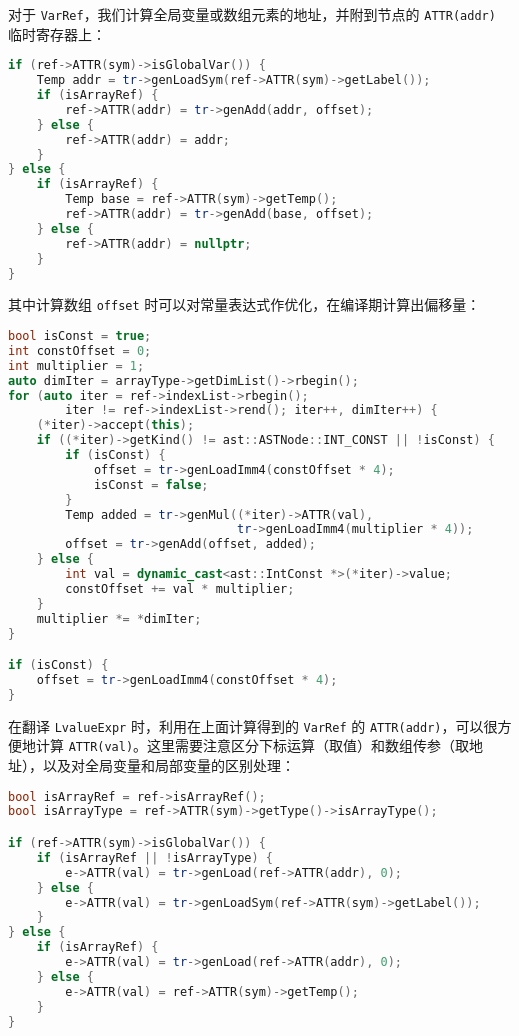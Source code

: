 \documentclass[a4paper]{article}
\begin{document}
对于 \texttt{VarRef}，我们计算全局变量或数组元素的地址，并附到节点的 \texttt{ATTR(addr)} 临时寄存器上：

\begin{lstlisting}[language=c++]
if (ref->ATTR(sym)->isGlobalVar()) {
    Temp addr = tr->genLoadSym(ref->ATTR(sym)->getLabel());
    if (isArrayRef) {
        ref->ATTR(addr) = tr->genAdd(addr, offset);
    } else {
        ref->ATTR(addr) = addr;
    }
} else {
    if (isArrayRef) {
        Temp base = ref->ATTR(sym)->getTemp();
        ref->ATTR(addr) = tr->genAdd(base, offset);
    } else {
        ref->ATTR(addr) = nullptr;
    }
}
\end{lstlisting}

其中计算数组 \texttt{offset} 时可以对常量表达式作优化，在编译期计算出偏移量：

\begin{lstlisting}[language=c++]
bool isConst = true;
int constOffset = 0;
int multiplier = 1;
auto dimIter = arrayType->getDimList()->rbegin();
for (auto iter = ref->indexList->rbegin();
        iter != ref->indexList->rend(); iter++, dimIter++) {
    (*iter)->accept(this);
    if ((*iter)->getKind() != ast::ASTNode::INT_CONST || !isConst) {
        if (isConst) {
            offset = tr->genLoadImm4(constOffset * 4);
            isConst = false;
        }
        Temp added = tr->genMul((*iter)->ATTR(val),
                                tr->genLoadImm4(multiplier * 4));
        offset = tr->genAdd(offset, added);
    } else {
        int val = dynamic_cast<ast::IntConst *>(*iter)->value;
        constOffset += val * multiplier;
    }
    multiplier *= *dimIter;
}

if (isConst) {
    offset = tr->genLoadImm4(constOffset * 4);
}
\end{lstlisting}
    
在翻译 \texttt{LvalueExpr} 时，利用在上面计算得到的 \texttt{VarRef} 的 \texttt{ATTR(addr)}，可以很方便地计算 \texttt{ATTR(val)}。这里需要注意区分下标运算（取值）和数组传参（取地址），以及对全局变量和局部变量的区别处理：

\begin{lstlisting}[language=c++]
bool isArrayRef = ref->isArrayRef();
bool isArrayType = ref->ATTR(sym)->getType()->isArrayType();

if (ref->ATTR(sym)->isGlobalVar()) {
    if (isArrayRef || !isArrayType) {
        e->ATTR(val) = tr->genLoad(ref->ATTR(addr), 0);
    } else {
        e->ATTR(val) = tr->genLoadSym(ref->ATTR(sym)->getLabel());
    }
} else {
    if (isArrayRef) {
        e->ATTR(val) = tr->genLoad(ref->ATTR(addr), 0);
    } else {
        e->ATTR(val) = ref->ATTR(sym)->getTemp();
    }
}
\end{lstlisting}
\end{document}
